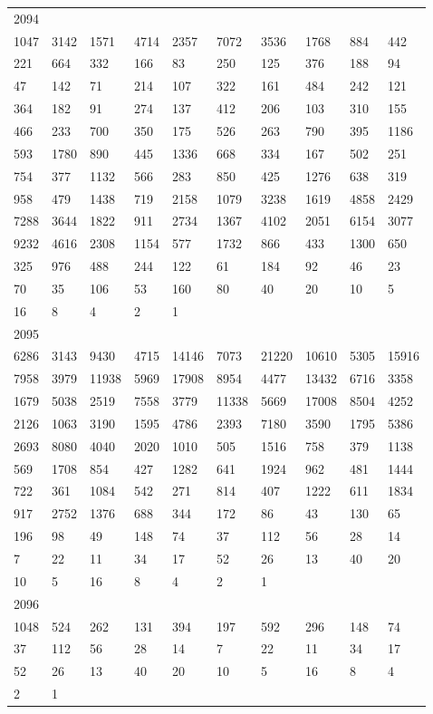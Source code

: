 \begin{longtable}{*{10}{l}}
2094&&&&&&&&&\\
1047& 3142& 1571& 4714& 2357& 7072& 3536& 1768& 884& 442\\
221& 664& 332& 166& 83& 250& 125& 376& 188& 94\\
47& 142& 71& 214& 107& 322& 161& 484& 242& 121\\
364& 182& 91& 274& 137& 412& 206& 103& 310& 155\\
466& 233& 700& 350& 175& 526& 263& 790& 395& 1186\\
593& 1780& 890& 445& 1336& 668& 334& 167& 502& 251\\
754& 377& 1132& 566& 283& 850& 425& 1276& 638& 319\\
958& 479& 1438& 719& 2158& 1079& 3238& 1619& 4858& 2429\\
7288& 3644& 1822& 911& 2734& 1367& 4102& 2051& 6154& 3077\\
9232& 4616& 2308& 1154& 577& 1732& 866& 433& 1300& 650\\
325& 976& 488& 244& 122& 61& 184& 92& 46& 23\\
70& 35& 106& 53& 160& 80& 40& 20& 10& 5\\
16& 8& 4& 2& 1& \\

2095&&&&&&&&&\\
6286& 3143& 9430& 4715& 14146& 7073& 21220& 10610& 5305& 15916\\
7958& 3979& 11938& 5969& 17908& 8954& 4477& 13432& 6716& 3358\\
1679& 5038& 2519& 7558& 3779& 11338& 5669& 17008& 8504& 4252\\
2126& 1063& 3190& 1595& 4786& 2393& 7180& 3590& 1795& 5386\\
2693& 8080& 4040& 2020& 1010& 505& 1516& 758& 379& 1138\\
569& 1708& 854& 427& 1282& 641& 1924& 962& 481& 1444\\
722& 361& 1084& 542& 271& 814& 407& 1222& 611& 1834\\
917& 2752& 1376& 688& 344& 172& 86& 43& 130& 65\\
196& 98& 49& 148& 74& 37& 112& 56& 28& 14\\
7& 22& 11& 34& 17& 52& 26& 13& 40& 20\\
10& 5& 16& 8& 4& 2& 1& \\

2096&&&&&&&&&\\
1048& 524& 262& 131& 394& 197& 592& 296& 148& 74\\
37& 112& 56& 28& 14& 7& 22& 11& 34& 17\\
52& 26& 13& 40& 20& 10& 5& 16& 8& 4\\
2& 1& \\


\end{longtable}
